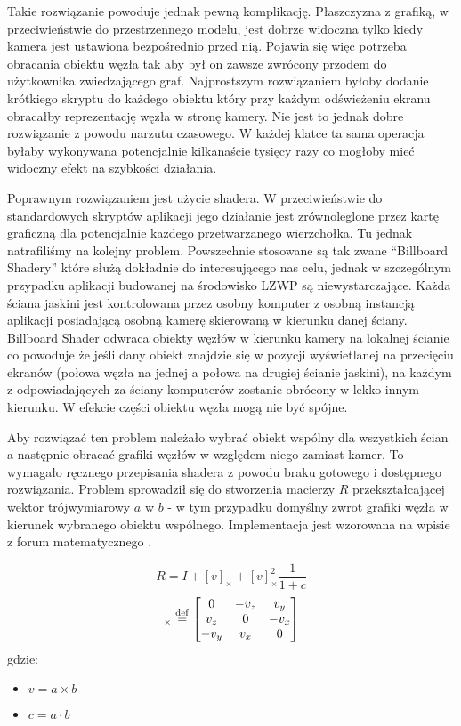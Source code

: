 Takie rozwiązanie powoduje jednak pewną komplikację. Płaszczyzna z grafiką, w przeciwieństwie do przestrzennego modelu, jest dobrze widoczna tylko kiedy kamera jest ustawiona bezpośrednio przed nią. Pojawia się więc potrzeba obracania obiektu węzła tak aby był on zawsze zwrócony przodem do użytkownika zwiedzającego graf. Najprostszym rozwiązaniem byłoby dodanie krótkiego skryptu do każdego obiektu który przy każdym odświeżeniu ekranu obracałby reprezentację węzła w stronę kamery. Nie jest to jednak dobre rozwiązanie z powodu narzutu czasowego. W każdej klatce ta sama operacja byłaby wykonywana potencjalnie kilkanaście tysięcy razy co mogłoby mieć widoczny efekt na szybkości działania.

Poprawnym rozwiązaniem jest użycie shadera. W przeciwieństwie do standardowych skryptów aplikacji jego działanie jest zrównoleglone przez kartę graficzną dla potencjalnie każdego przetwarzanego wierzchołka. Tu jednak natrafiliśmy na kolejny problem. Powszechnie stosowane są tak zwane ``Billboard Shadery'' które służą dokładnie do interesującego nas celu, jednak w szczególnym przypadku aplikacji budowanej na środowisko LZWP są niewystarczające. Każda ściana jaskini jest kontrolowana przez osobny komputer z osobną instancją aplikacji posiadającą osobną kamerę skierowaną w kierunku danej ściany. Billboard Shader odwraca obiekty węzłów w kierunku kamery na lokalnej ścianie co powoduje że jeśli dany obiekt znajdzie się w pozycji wyświetlanej na przecięciu ekranów (połowa węzła na jednej a połowa na drugiej ścianie jaskini), na każdym z odpowiadających za ściany komputerów zostanie obrócony w lekko innym kierunku. W efekcie części obiektu węzła mogą nie być spójne.

Aby rozwiązać ten problem należało wybrać obiekt wspólny dla wszystkich ścian a następnie obracać grafiki węzłów w względem niego zamiast kamer. To wymagało ręcznego przepisania shadera z powodu braku gotowego i dostępnego rozwiązania. Problem sprowadził się do stworzenia macierzy \(R\) przekształcającej wektor trójwymiarowy \(a\) w \(b\) - w tym przypadku domyślny zwrot grafiki węzła w kierunek wybranego obiektu wspólnego. Implementacja jest wzorowana na wpisie z forum matematycznego \cite{BillboardShaderFormula}.

\newcommand\dotProd{a \cdot b}
\newcommand\crossProd[1]{(\overrightarrow{a \times b})_#1}
\begin{equation}
	R = I + [v]_{\times} + [v]_{\times}^2\frac{1}{1 + c}
\end{equation}
\begin{equation}
	[v]_{\times} \stackrel{\rm def}{=} 
	\begin{bmatrix}
		0 & -v_z & v_y\\
		v_z & 0 & -v_x\\
		-v_y & v_x & 0
	\end{bmatrix}
\end{equation}
gdzie:
\begin{itemize}
	\item \(v = a \times b\)
	\item \(c = a \cdot b\)
\end{itemize}

